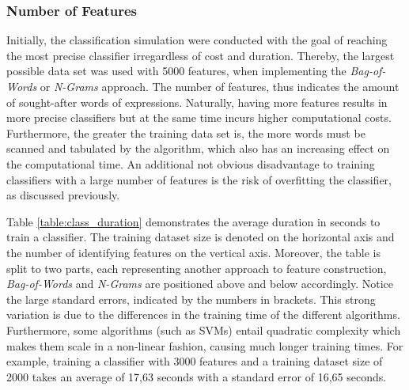 		\subsubsection{Number of Features}
			Initially, the classification simulation were conducted with the goal of reaching the most precise classifier irregardless of cost and duration. Thereby, the largest possible data set was used with 5000 features, when implementing the \textit{Bag-of-Words} or \textit{N-Grams} approach. The number of features, thus indicates the amount of sought-after words of expressions. Naturally, having more features results in more precise classifiers but at the same time incurs higher computational costs. Furthermore, the greater the training data set is, the more words must be scanned and tabulated by the algorithm, which also has an increasing effect on the computational time. An additional not obvious disadvantage to training classifiers with a large number of features is the risk of overfitting the classifier, as discussed previously. 
			
			\par
			Table \ref{table:class_duration} demonstrates the average duration in seconds to train a classifier. The training dataset size is denoted on the horizontal axis and the number of identifying features on the vertical axis. Moreover, the table is split to two parts, each representing another approach to feature construction, \textit{Bag-of-Words} and \textit{N-Grams} are positioned above and below accordingly. Notice the large standard errors, indicated by the numbers in brackets. This strong variation is due to the differences in the training time of the different algorithms. Furthermore, some algorithms (such as SVMs) entail quadratic complexity which makes them scale in a non-linear fashion, causing much longer training times. For example, training a classifier with 3000 features and a training dataset size of 2000 takes an average of 17,63 seconds with a standard error of 16,65 seconds.
			
